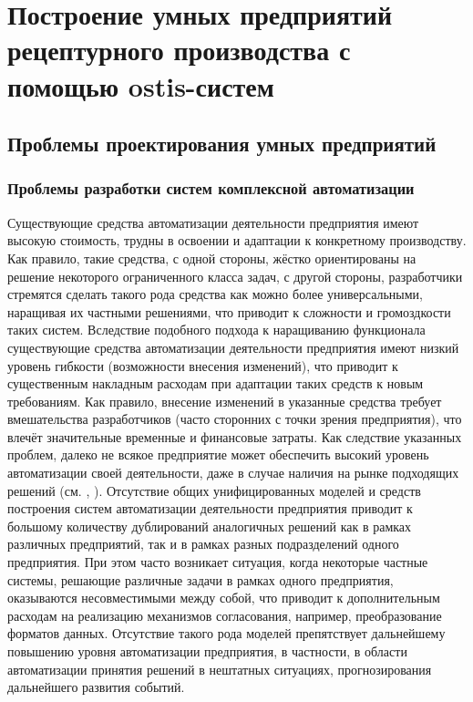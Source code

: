 \section{Построение умных предприятий рецептурного производства с помощью ostis-систем}


\subsection{Проблемы проектирования умных предприятий}


\subsubsection{Проблемы разработки систем комплексной автоматизации}

Существующие средства автоматизации деятельности предприятия имеют высокую стоимость, трудны в освоении и адаптации к конкретному производству. Как правило, такие средства, с одной стороны, жёстко ориентированы на решение некоторого ограниченного класса задач, с другой стороны, разработчики стремятся сделать такого рода средства как можно более универсальными, наращивая их частными решениями, что приводит к сложности и громоздкости таких систем. Вследствие подобного подхода к наращиванию функционала существующие средства автоматизации деятельности предприятия имеют низкий уровень гибкости (возможности внесения изменений), что приводит к существенным накладным расходам при адаптации таких средств к новым требованиям. Как правило, внесение изменений в указанные средства требует вмешательства разработчиков (часто сторонних с точки зрения предприятия), что влечёт значительные временные и финансовые затраты. Как следствие указанных проблем, далеко не всякое предприятие может обеспечить высокий уровень автоматизации своей деятельности, даже в случае наличия на рынке подходящих решений (см. , ).
Отсутствие общих унифицированных моделей и средств построения систем автоматизации деятельности предприятия приводит к большому количеству дублирований аналогичных решений как в рамках различных предприятий, так и в рамках разных подразделений одного предприятия. При этом часто возникает ситуация, когда некоторые частные системы, решающие различные задачи в рамках одного предприятия, оказываются несовместимыми между собой, что приводит к дополнительным расходам на реализацию механизмов согласования, например, преобразование форматов данных. Отсутствие такого рода моделей препятствует дальнейшему повышению уровня автоматизации предприятия, в частности, в области автоматизации принятия решений в нештатных ситуациях, прогнозирования дальнейшего развития событий.

